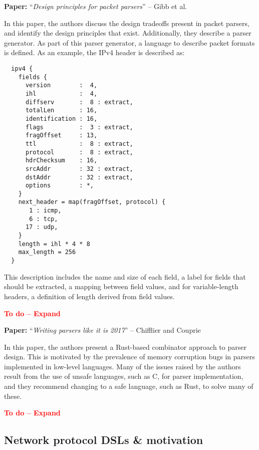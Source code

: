 \documentclass[10pt,a4paper]{article}
\newcommand{\todo}[1]{\textbf{\textcolor{red}{To do -- #1}}}
\newcommand{\paper}[3]{\vspace{4mm}\noindent\textbf{Paper:} ``\textit{#1}'' -- #2 \cite{#3}\vspace{3mm}}
\begin{document}
\paper{Design principles for packet parsers}{Gibb et al.}{gibb2013design}

In this paper, the authors discuss the design tradeoffs present in packet parsers, and
identify the design principles that exist. Additionally, they describe a parser generator.
As part of this parser generator, a language to describe packet formats is defined.
As an example, the IPv4 header is described as:

\begin{verbatim}
  ipv4 {
    fields {
      version        :  4,
      ihl            :  4,
      diffserv       :  8 : extract,
      totalLen       : 16,
      identification : 16,
      flags          :  3 : extract,
      fragOffset     : 13,
      ttl            :  8 : extract,
      protocol       :  8 : extract,
      hdrChecksum    : 16,
      srcAddr        : 32 : extract,
      dstAddr        : 32 : extract,
      options        : *,
    }
    next_header = map(fragOffset, protocol) {
       1 : icmp,
       6 : tcp,
      17 : udp,
    }
    length = ihl * 4 * 8
    max_length = 256
  }
\end{verbatim}

This description includes the name and size of each field, a label for fields that should
be extracted, a mapping between field values, and for variable-length headers, a
definition of length derived from field values.

\todo{Expand}

\paper{Writing parsers like it is 2017}{Chifflier and Couprie}{chifflier2017writing}

In this paper, the authors present a Rust-based combinator approach to parser design. This
is motivated by the prevalence of memory corruption bugs in parsers implemented in
low-level languages. Many of the issues raised by the authors result from the use of
unsafe languages, such as C, for parser implementation, and they recommend changing to a 
safe language, such as Rust, to solve many of these.

\todo{Expand}

\subsection{Network protocol DSLs \& motivation}
\end{document}
